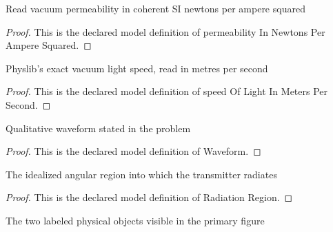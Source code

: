 \begin{definition}
  \label{def:physics:phyx-mini-0944:phyxminiproblems-problemphyxmini0944-permeabilityinnewtonsperamperesquared}
  Read vacuum permeability in coherent SI newtons per ampere squared
\end{definition}
\begin{proof}
  This is the declared model definition of permeability In Newtons Per Ampere Squared.
\end{proof}
\begin{definition}
  \label{def:physics:phyx-mini-0944:phyxminiproblems-problemphyxmini0944-speedoflightinmeterspersecond}
  Physlib's exact vacuum light speed, read in metres per second
\end{definition}
\begin{proof}
  This is the declared model definition of speed Of Light In Meters Per Second.
\end{proof}
\begin{definition}[Waveform]
  \label{def:physics:phyx-mini-0944:phyxminiproblems-problemphyxmini0944-waveform}
  Qualitative waveform stated in the problem
\end{definition}
\begin{proof}
  This is the declared model definition of Waveform.
\end{proof}
\begin{definition}
  \label{def:physics:phyx-mini-0944:phyxminiproblems-problemphyxmini0944-radiationregion}
  The idealized angular region into which the transmitter radiates
\end{definition}
\begin{proof}
  This is the declared model definition of Radiation Region.
\end{proof}
\begin{definition}
  \label{def:physics:phyx-mini-0944:phyxminiproblems-problemphyxmini0944-figureobject}
  The two labeled physical objects visible in the primary figure
\end{definition}
